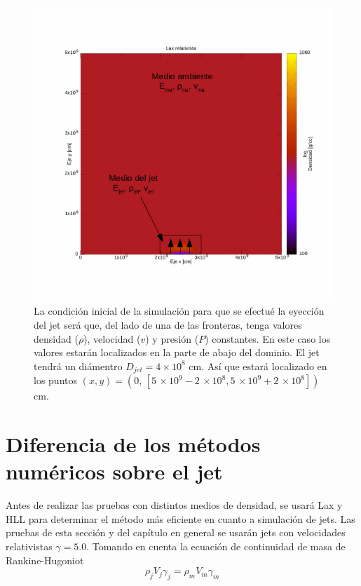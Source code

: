 \documentclass[12pt,a4paper]{book}
\begin{document}
\begin{figure}
\centering
\includegraphics[scale=0.5]{./Figuras/Pruebas/Prueba_jet/jet_ejemplo}
\caption{\label{fig:condicion_inicial_jet}La condición inicial de la simulación para que se efectué la eyección del jet será que, del lado de una de las fronteras, tenga valores  densidad ($\rho$), velocidad ($v$) y presión ($P$) constantes. En este caso los valores estarán localizados en la parte de abajo del dominio. El jet tendrá un diámentro $D_{jet} = 4 \times 10^{8}$ cm. Así que estará localizado en los puntos $(x,y) = (0, \, [5\, \times 10^9 - 2\, \times 10^8, 5\, \times 10^9 + 2\, \times 10^8] )$ cm.}
\end{figure}


\section{Diferencia de los métodos numéricos sobre el jet}\label{sec:Diferencia_de_los_metodos_numéricos_sobre_el_jet}

Antes de realizar las pruebas con distintos medios de densidad, se usará Lax y HLL para determinar el método más eficiente en cuanto a simulación de jets. Las pruebas de esta sección y del capítulo en general se usarán jets con velocidades relativistas $\gamma = 5.0$. Tomando en cuenta la ecuación de continuidad de masa de Rankine-Hugoniot
\begin{equation}\label{eq:masa_?}
\rho_j V_j \gamma_j = \rho_m V_m \gamma_m 
\end{equation}
\end{document}
